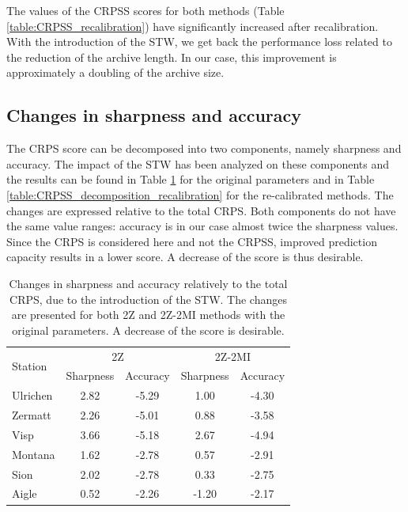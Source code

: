 \documentclass[hess]{copernicus}
\begin{document}
The values of the CRPSS scores for both methods (Table \ref{table:CRPSS_recalibration}) have significantly increased after recalibration. With the introduction of the STW, we get back the performance loss related to the reduction of the archive length. In our case, this improvement is approximately a doubling of the archive size.


\subsection{Changes in sharpness and accuracy}

The CRPS score can be decomposed into two components, namely sharpness and accuracy. The impact of the STW has been analyzed on these components and the results can be found in Table \ref{table:CRPSS_decomposition_no_recalibration} for the original parameters and in Table \ref{table:CRPSS_decomposition_recalibration} for the re-calibrated methods. The changes are expressed relative to the total CRPS. Both components do not have the same value ranges: accuracy is in our case almost twice the sharpness values. Since the CRPS is considered here and not the CRPSS, improved prediction capacity results in a lower score. A decrease of the score is thus desirable.

\begin{table}[htb]
	\caption{Changes in sharpness and accuracy relatively to the total CRPS, due to the introduction of the STW. The changes are presented for both 2Z and 2Z-2MI methods with the original parameters. A decrease of the score is desirable.}
	\begin{center}
		\begin{tabular}{l c c c c}
			\hline
			\multirow{2}{*}{Station} & \multicolumn{2}{c}{2Z} & \multicolumn{2}{c}{2Z-2MI} \\
			& Sharpness & Accuracy & Sharpness & Accuracy \\
			\hline
			Ulrichen & 2.82 & -5.29 & 1.00 & -4.30 \\
			Zermatt & 2.26 & -5.01 & 0.88 & -3.58 \\
			Visp & 3.66 & -5.18 & 2.67 & -4.94 \\
			Montana & 1.62 & -2.78 & 0.57 & -2.91 \\
			Sion & 2.02 & -2.78 & 0.33 & -2.75 \\
			Aigle & 0.52 & -2.26 & -1.20 & -2.17 \\ 
			\hline
		\end{tabular}
	\end{center}
	\label{table:CRPSS_decomposition_no_recalibration}
\end{table}
\end{document}
